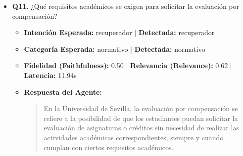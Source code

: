 \documentclass[12pt,a4paper,oneside]{report}
\begin{document}
\begin{itemize}
\begin{itemize}
\begin{quote}
En cuanto a la pregunta del usuario, el número máximo de créditos que se pueden compensar en un Grado en la Universidad de Sevilla es el 60\% del total de créditos del plan de estudios correspondiente al título que se pretende cursar. Por ejemplo, si el plan de estudios tiene 240 créditos, el número máximo de créditos que se pueden compensar sería 144 créditos (60\% de 240).
                \end{quote}
          \item \textbf{{Ground Truth (Referencia):}} \\
                \begin{quote}
Se permite la evaluación por compensación de un máximo de 6 créditos correspondientes a una única asignatura de un plan de estudios de Grado.
                \end{quote}
          \item \textbf{{Referencias / Fuentes Utilizadas:}} \\
                \begin{itemize}
                  \item Normativa Reconocimiento y Transferencia de creditos.pdf (Página 6)
                  \item Normativa Reconocimiento y Transferencia de creditos.pdf (Página 3)
                  \item Guia\_Movilidad\_Intern\_FAC\_TUR\_FINANZAS.pdf (Página 7)
                  \item Guia\_Movilidad\_Intern\_FAC\_TUR\_FINANZAS.pdf (Página 6)
                \end{itemize}
        \end{itemize}

  
\item \textbf{Q11.} ¿Qué requisitos académicos se exigen para solicitar la evaluación por compensación? \\
        \begin{itemize}
          \item \textbf{Intención Esperada:} recuperador | \textbf{Detectada:} recuperador
          \item \textbf{Categoría Esperada:} normativo | \textbf{Detectada:} normativo
          \item \textbf{Fidelidad (Faithfulness):} 0.50 | \textbf{Relevancia (Relevance):} 0.62 | \textbf{Latencia:} 11.94s
          \item \textbf{{Respuesta del Agente:}} \\
                \begin{quote}
En la Universidad de Sevilla, la evaluación por compensación se refiere a la posibilidad de que los estudiantes puedan solicitar la evaluación de asignaturas o créditos sin necesidad de realizar las actividades académicas correspondientes, siempre y cuando cumplan con ciertos requisitos académicos.


\end{quote}
\end{itemize}
\end{itemize}
\end{document}
